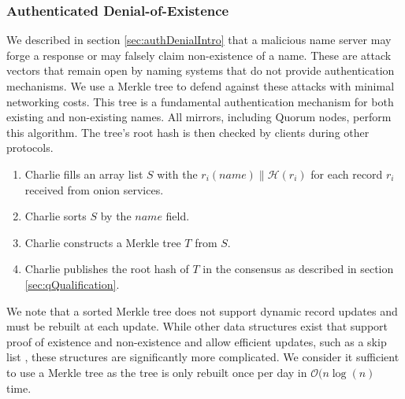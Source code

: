 \documentclass[USenglish,oneside,twocolumn]{article}
\newcommand*\concat{\mathbin{\|}}
\begin{document}

\subsubsection{Authenticated Denial-of-Existence}
\label{sec:authDenial}

We described in section \ref{sec:authDenialIntro} that a malicious name server may forge a response or may falsely claim non-existence of a name. These are attack vectors that remain open by naming systems that do not provide authentication mechanisms. We use a Merkle tree \cite{merkle1988digital} to defend against these attacks with minimal networking costs. This tree is a fundamental authentication mechanism for both existing and non-existing names. All mirrors, including Quorum nodes, perform this algorithm. The tree's root hash is then checked by clients during other protocols.

\begin{enumerate}
	\item Charlie fills an array list $ S $ with the $ r_{i}(\mathit{name}) \concat \mathcal{H}(r_{i}) $ for each record $ r_{i} $ received from onion services.
	\item Charlie sorts $ S $ by the $ \mathit{name} $ field.
	\item Charlie constructs a Merkle tree $ T $ from $ S $.
	\item Charlie publishes the root hash of $ T $ in the consensus as described in section \ref{sec:qQualification}.
\end{enumerate}

We note that a sorted Merkle tree does not support dynamic record updates and must be rebuilt at each update. While other data structures exist that support proof of existence and non-existence and allow efficient updates, such as a skip list \cite{goodrich2001implementation}, these structures are significantly more complicated. We consider it sufficient to use a Merkle tree as the tree is only rebuilt once per day in $ \mathcal{O}(n \log(n) $ time.


\end{document}
